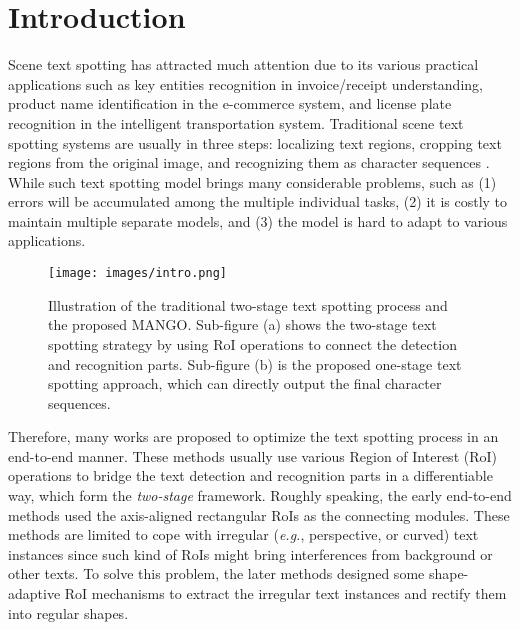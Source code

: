 \documentclass[letterpaper]{article} \usepackage{aaai21}  \usepackage{times}  \usepackage{helvet} \usepackage{courier}  \usepackage[hyphens]{url}  \usepackage{graphicx} \urlstyle{rm} \def\UrlFont{\rm}  \usepackage{natbib}  \usepackage{caption} \frenchspacing  \setlength{\pdfpagewidth}{8.5in}  \setlength{\pdfpageheight}{11in}  \usepackage{multirow}
\begin{document}
\section{Introduction}
Scene text spotting has attracted much attention due to its various practical applications such as key entities recognition in invoice/receipt understanding, product name identification in the e-commerce system, and license plate recognition in the intelligent transportation system.
Traditional scene text spotting systems are usually in three steps: localizing text regions, cropping text regions from the original image, and recognizing them as character sequences \cite{wang2012end,jaderberg2014deep,neumann2015real,gomez2017textproposals}.
While such text spotting model brings many considerable problems, such as (1) errors will be accumulated among the multiple individual tasks, (2) it is costly to maintain multiple separate models, and (3) the model is hard to adapt to various applications.
\begin{figure}[!t]
\begin{center}
\texttt{[image: images/intro.png]}\\
\end{center}
\caption{
Illustration of the traditional two-stage text spotting process and the proposed MANGO.
Sub-figure (a) shows the two-stage text spotting strategy by using RoI operations to connect the detection and recognition parts.
Sub-figure (b) is the proposed one-stage text spotting approach, which can directly output the final character sequences.
}
\label{fig:0}
\end{figure}

Therefore, many works \cite{li2017towards,bartz2017see,he2018end,sun2018textnet,liao2019mask} are proposed to optimize the text spotting process in an end-to-end manner.
These methods usually use various Region of Interest (RoI) operations to bridge the text detection and recognition parts in a differentiable way, which form the \emph{two-stage} framework.
Roughly speaking,
the early end-to-end methods \cite{li2017towards,busta2017deep,liu2018fots,he2018end} used the axis-aligned  rectangular RoIs as the connecting modules. These methods are limited to cope with irregular (\emph{e.g.}, perspective, or curved) text instances since such kind of RoIs might bring interferences from background or other texts.
To solve this problem, the later methods \cite{feng2019textdragon,qiao2020text,wang2020all,qin2019towards,liu2020abcnet} designed some shape-adaptive RoI mechanisms to extract the irregular text instances and rectify them into regular shapes.
\end{document}
